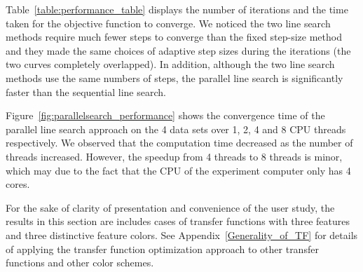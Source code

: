 Table~\ref{table:performance_table} displays the number of iterations and the time taken for the objective function to converge.
We noticed the two line search methods require much fewer steps to converge than the fixed step-size method and they made the same choices of adaptive step sizes during the iterations (the two curves completely overlapped).
In addition, although the two line search methods use the same numbers of steps, the parallel line search is significantly faster than the sequential line search.

Figure~\ref{fig:parallelsearch_performance} shows the convergence time of the parallel line search approach on the 4 data sets over 1, 2, 4 and 8 CPU threads respectively.
We observed that the computation time decreased as the number of threads increased. However, the speedup from 4 threads to 8 threads is minor, which may due to the fact that the CPU of the experiment computer only has 4 cores.

For the sake of clarity of presentation and convenience of the user study, the results in this section are includes cases of transfer functions with three features and three distinctive feature colors. See Appendix~\ref{Generality_of_TF} for details of applying the transfer function optimization approach to other transfer functions and other color schemes.


